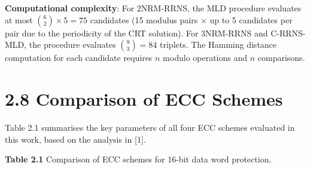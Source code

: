 \documentclass[
  english,
  12pt,
]{report}
\begin{document}
\textbf{Computational complexity}: For 2NRM-RRNS, the MLD procedure
evaluates at most \(\binom{6}{2} \times 5 = 75\) candidates (15 modulus
pairs × up to 5 candidates per pair due to the periodicity of the CRT
solution). For 3NRM-RRNS and C-RRNS-MLD, the procedure evaluates
\(\binom{9}{3} = 84\) triplets. The Hamming distance computation for
each candidate requires \(n\) modulo operations and \(n\) comparisons.

\section{2.8 Comparison of ECC Schemes}\label{comparison-of-ecc-schemes}

Table 2.1 summarises the key parameters of all four ECC schemes
evaluated in this work, based on the analysis in {[}1{]}.

\textbf{Table 2.1} Comparison of ECC schemes for 16-bit data word
protection.
\end{document}
